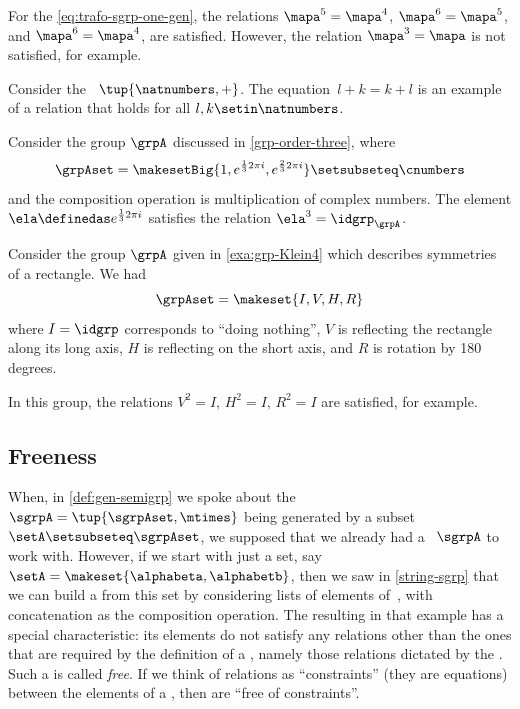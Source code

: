 \begin{example}
    For the  \cref{eq:trafo-sgrp-one-gen}, the relations $\mapa^5 = \mapa^4$, $\mapa^6 = \mapa^5$, and $\mapa^6 = \mapa^4$, \etc are satisfied.
    However, the relation $\mapa^3 = \mapa$ is not satisfied, for example.

\end{example}

\begin{example}
    Consider the ~$\tup{\natnumbers, +}$.
    The equation~$l + k = k + l$ is an example of a relation that holds for all $l, k \setin \natnumbers$.
\end{example}

\begin{example}
    Consider the group $\grpA$ discussed in \cref{grp-order-three}, where
    \begin{equation}
        \grpAset = \makesetBig{ 1, e^{\frac{1}{3}2\pi i}, e^{\frac{2 }{3}2\pi i} } \setsubseteq \cnumbers
    \end{equation}
    and the composition operation is multiplication of complex numbers.
    The element $\ela \definedas e^{\frac{1}{3}2\pi i}$ satisfies the relation $\ela^3 = \idgrp_\grpA$.
\end{example}

\begin{example}
    Consider the group $\grpA$ given in \cref{exa:grp-Klein4} which describes symmetries of a rectangle.
    We had
    \begin{equation}
        \grpAset = \makeset{ I, V, H, R}
    \end{equation}
    where $I = \idgrp$ corresponds to ``doing nothing'', $V$ is reflecting the rectangle along its long axis, $H$ is reflecting on the short axis, and $R$ is rotation by 180 degrees.

    In this group, the relations $V^2 = I$, $H^2 = I$, $R^2 = I$ are satisfied, for example.
\end{example}

\subsection{Freeness}

When, in \cref{def:gen-semigrp} we spoke about the ~$\sgrpA = \tup{\sgrpAset, \mtimes}$ being generated by a subset~$\setA \setsubseteq \sgrpAset$, we supposed that we already had a ~$\sgrpA$ to work with.
However, if we start with just a set, say~$\setA = \makeset{ \alphabeta, \alphabetb}$, then we saw in \cref{string-sgrp} that we can build a  from this set by considering lists of elements of~\setA, with concatenation as the composition operation.
The resulting  in that example has a special characteristic: its elements do not satisfy any relations other than the ones that are required by the definition of a , namely those relations dictated by the .
Such a  is called \emph{free}.
If we think of relations as ``constraints'' (they are equations) between the elements of a , then  are ``free of constraints''.

